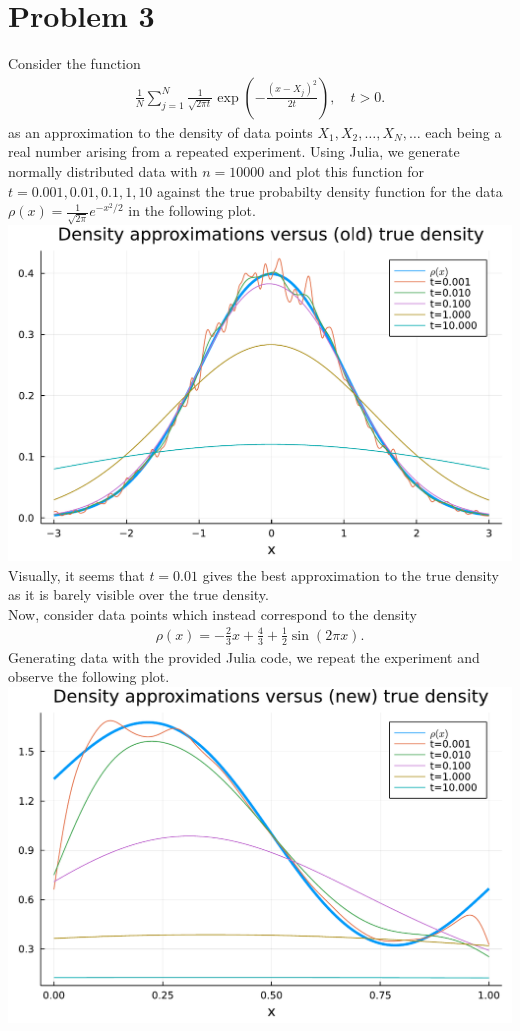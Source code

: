 \documentclass{article}
\begin{document}
\section{Problem 3}
Consider the function 
\begin{align*}
	\frac{1}{N} \sum_{j=1}^N \frac{1}{\sqrt{2 \pi t}} \exp \left( - \frac{(x - X_j)^2}{2t} \right), \quad t > 0.
\end{align*}
as an approximation to the density of data points $X_1,X_2,\ldots,X_N,\ldots$ each being a real number arising from a repeated experiment. Using Julia, we generate normally distributed data with $n = 10000$ and plot this function for $t = 0.001,0.01,0.1,1,10$ against the true probabilty density function for the data $\rho(x) = \frac{1}{\sqrt{2 \pi}} e^{-x^2/2}$ in the following plot. \\
\includegraphics[scale=0.5]{density_approx.pdf}\\
Visually, it seems that $t=0.01$ gives the best approximation to the true density as it is barely visible over the true density. \\
Now, consider data points which instead correspond to the density
\begin{align*}
	\rho(x) = - \frac 2 3 x + \frac 4 3 + \frac 1 2 \sin(2 \pi x).
\end{align*}
Generating data with the provided Julia code, we repeat the experiment and observe the following plot. \\
\includegraphics[scale=0.5]{density_approx_new.pdf}\\
\end{document}
